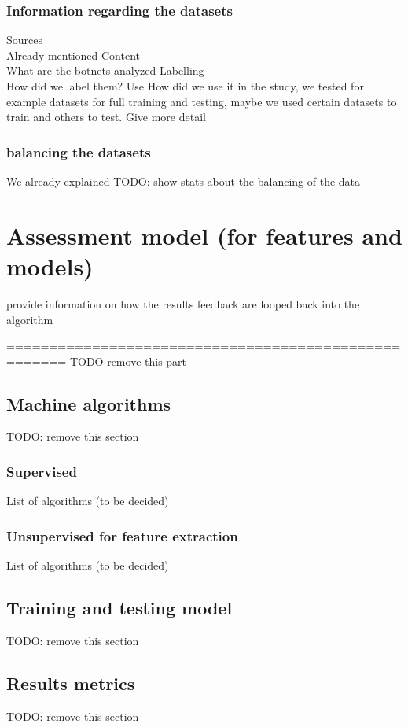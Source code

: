 \subsubsection{Information regarding the datasets}
Sources\\
	Already mentioned
Content\\
	What are the botnets analyzed
Labelling\\
	How did we label them?
Use
	How did we use it in the study, we tested for example datasets for full training and testing, maybe we used certain datasets to train and others to test. Give more detail
\subsubsection{balancing the datasets}
We already explained
TODO: show stats about the balancing of the data
\section{Assessment model (for features and models)}
provide information on how the results feedback are looped back into the algorithm

=====================================================
TODO remove this part

\subsection{Machine algorithms}
TODO: remove this section
\subsubsection{Supervised}
List of algorithms (to be decided)
\subsubsection{Unsupervised for feature extraction}
List of algorithms (to be decided)
\subsection{Training and testing model}
TODO: remove this section
\cite{dns-traffic}
\subsection{Results metrics}
TODO: remove this section
\cite{fitting}